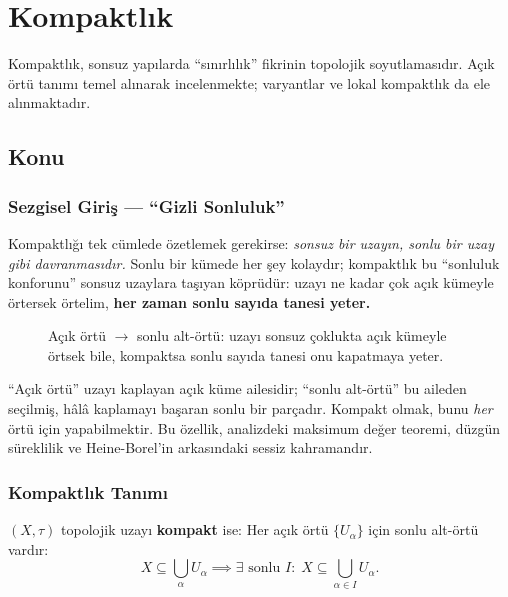 \chapter{Kompaktlık}

Kompaktlık, sonsuz yapılarda ``sınırlılık'' fikrinin topolojik soyutlamasıdır.
Açık örtü tanımı temel alınarak incelenmekte; varyantlar ve lokal kompaktlık da ele alınmaktadır.

\section{Konu}

\subsection{Sezgisel Giriş — ``Gizli Sonluluk''}

Kompaktlığı tek cümlede özetlemek gerekirse: \emph{sonsuz bir uzayın, sonlu bir
uzay gibi davranmasıdır.} Sonlu bir kümede her şey kolaydır; kompaktlık bu
``sonluluk konforunu'' sonsuz uzaylara taşıyan köprüdür: uzayı ne kadar çok açık
kümeyle örtersek örtelim, \textbf{her zaman sonlu sayıda tanesi yeter.}

\begin{figure}[ht]
  \centering
  
  \caption{Açık örtü $\to$ sonlu alt-örtü: uzayı sonsuz çoklukta açık kümeyle
    örtsek bile, kompaktsa sonlu sayıda tanesi onu kapatmaya yeter.}
\end{figure}

\begin{sezgi}
``Açık örtü'' uzayı kaplayan açık küme ailesidir; ``sonlu alt-örtü'' bu aileden
seçilmiş, hâlâ kaplamayı başaran sonlu bir parçadır. Kompakt olmak, bunu
\emph{her} örtü için yapabilmektir. Bu özellik, analizdeki maksimum değer
teoremi, düzgün süreklilik ve Heine-Borel'in arkasındaki sessiz kahramandır.
\end{sezgi}

\subsection{Kompaktlık Tanımı}

\begin{definition}
$(X, \tau)$ topolojik uzayı \textbf{kompakt} ise:
Her açık örtü $\{U_\alpha\}$ için sonlu alt-örtü vardır:
\[
X \subseteq \bigcup_{\alpha} U_\alpha
\implies
\exists \text{ sonlu } I:\; X \subseteq \bigcup_{\alpha \in I} U_\alpha.
\]
\end{definition}

